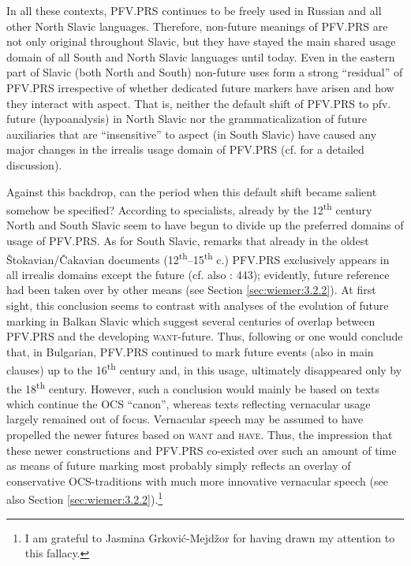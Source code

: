 \documentclass[output=paper,colorlinks,citecolor=brown]{langscibook}
\begin{document}
In all these contexts, PFV.PRS continues to be freely used in Russian and all other North Slavic languages. Therefore, non-future meanings of PFV.PRS are not only original throughout Slavic, but they have stayed the main shared usage domain of all South and North Slavic languages until today. Even in the eastern part of Slavic (both North and South) non-future uses form a strong “residual” of PFV.PRS irrespective of whether dedicated future markers have arisen and how they interact with aspect. That is, neither the default shift of PFV.PRS to pfv. future (hypoanalysis) in North Slavic nor the grammaticalization of future auxiliaries that are “insensitive” to aspect (in South Slavic) have caused any major changes in the irrealis usage domain of PFV.PRS (cf. \citeauthor{Wiemer2026} \citeyear{Wiemer2026} for a detailed discussion). 

Against this backdrop, can the period when this default shift became salient somehow be specified? According to specialists, already by the 12\textsuperscript{th} century North and South Slavic seem to have begun to divide up the preferred domains of usage of PFV.PRS. As for South Slavic, \citet[87]{Grković-Mejdžor2012} remarks that already in the oldest Štokavian/Čakavian documents (12\textsuperscript{th}--15\textsuperscript{th }c.) PFV.PRS exclusively appears in all irrealis domains except the future (cf. also \cite{Belić1999}: 443); evidently, future reference had been taken over by other means (see Section \ref{sec:wiemer:3.2.2}). At first sight, this conclusion seems to contrast with analyses of the evolution of future marking in Balkan Slavic which suggest several centuries of overlap between PFV.PRS and the developing \textsc{want}-future. Thus, following \citet[42--49, 67--68]{Ivanova-Mirčeva1962} or \citet{asenova_guentcheva_2022} one would conclude that, in Bulgarian, PFV.PRS continued to mark future events (also in main clauses) up to the 16\textsuperscript{th} century and, in this usage, ultimately disappeared only by the 18\textsuperscript{th} century. However, such a conclusion would mainly be based on texts which continue the OCS “canon”, whereas texts reflecting vernacular usage largely remained out of focus. Vernacular speech may be assumed to have propelled the newer futures based on \textsc{want} and \textsc{have}. Thus, the impression that these newer constructions and PFV.PRS co-existed over such an amount of time as means of future marking most probably simply reflects an overlay of conservative OCS-traditions with much more innovative vernacular speech (see also Section \ref{sec:wiemer:3.2.2}).\footnote{I am grateful to Jasmina Grković-Mejdžor for having drawn my attention to this fallacy.}
\end{document}
